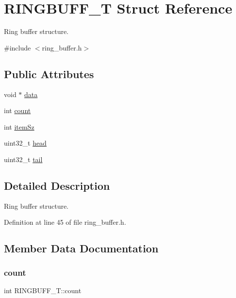 \hypertarget{struct_r_i_n_g_b_u_f_f___t}{}\section{R\+I\+N\+G\+B\+U\+F\+F\+\_\+T Struct Reference}
\label{struct_r_i_n_g_b_u_f_f___t}


Ring buffer structure.  




{\ttfamily \#include $<$ring\+\_\+buffer.\+h$>$}

\subsection*{Public Attributes}
\begin{DoxyCompactItemize}
\item 
void $\ast$ \hyperlink{struct_r_i_n_g_b_u_f_f___t_a72858dc34b0dd618118388924c28967c}{data}
\item 
int \hyperlink{struct_r_i_n_g_b_u_f_f___t_a87af72a615ed11d5c7000904a2fe5b4a}{count}
\item 
int \hyperlink{struct_r_i_n_g_b_u_f_f___t_a8d36d35edc73f36f7f81e98693ef3259}{item\+Sz}
\item 
uint32\+\_\+t \hyperlink{struct_r_i_n_g_b_u_f_f___t_a30c2ea59e510513e18bb22b4c783e6bb}{head}
\item 
uint32\+\_\+t \hyperlink{struct_r_i_n_g_b_u_f_f___t_a490ce2de2b2e234beeafdb9f9298f20f}{tail}
\end{DoxyCompactItemize}


\subsection{Detailed Description}
Ring buffer structure. 

Definition at line 45 of file ring\+\_\+buffer.\+h.



\subsection{Member Data Documentation}
\mbox{\label{struct_r_i_n_g_b_u_f_f___t_a87af72a615ed11d5c7000904a2fe5b4a}} 
\subsubsection{\texorpdfstring{count}{count}}
{\footnotesize\ttfamily int R\+I\+N\+G\+B\+U\+F\+F\+\_\+\+T\+::count}



